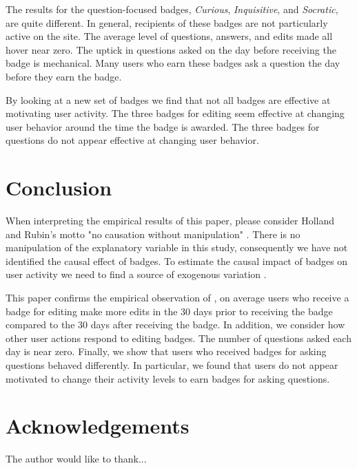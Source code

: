 \documentclass[conference]{IEEEtran}
\newcommand{\1}{\mathds{1}}
\begin{document}
The results for the question-focused badges, \textit{Curious}, \textit{Inquisitive}, and \textit{Socratic}, are quite different. In general, recipients of these badges are not particularly active on the site. The average level of questions, answers, and edits made all hover near zero. The uptick in questions asked on the day before receiving the badge is mechanical. Many users who earn these badges ask a question the day before they earn the badge.

By looking at a new set of badges we find that not all badges are effective at motivating user activity. The three badges for editing seem effective at changing user behavior around the time the badge is awarded. The three badges for questions do not appear effective at changing user behavior.

\section{Conclusion}

When interpreting the empirical results of this paper, please consider Holland and Rubin's motto "no causation without manipulation" \citep{Holland1986}. There is no manipulation of the explanatory variable in this study, consequently we have not identified the causal effect of badges. To estimate the causal impact of badges on user activity we need to find a source of exogenous variation \citep{Miller2013}.

This paper confirms the empirical observation of \citet{Grant2013}, on average users who receive a badge for editing make more edits in the 30 days prior to receiving the badge compared to the 30 days after receiving the badge. In addition, we consider how other user actions respond to editing badges. The number of questions asked each day is near zero. Finally, we show that users who received badges for asking questions behaved differently. In particular, we found that users do not appear motivated to change their activity levels to earn badges for asking questions.

\section*{Acknowledgements}

The author would like to thank...

\nocite{Antin2011, MSRChallenge2015, se-dump}

\renewcommand{\bibfont}{\small}


\end{document}
